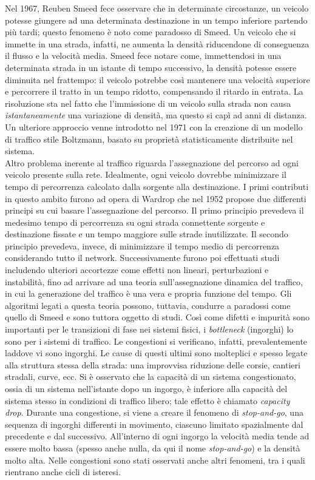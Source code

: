 \documentclass[../main.tex]{subfiles}
\begin{document}
Nel 1967, Reuben Smeed fece osservare che in determinate circostanze, un veicolo potesse giungere ad una determinata destinazione in un tempo inferiore partendo pi\`u tardi; questo fenomeno \`e noto come paradosso di Smeed.
Un veicolo che si immette in una strada, infatti, ne aumenta la densit\`a riducendone di conseguenza il flusso e la velocit\`a media.
Smeed fece notare come, immettendosi in una determinata strada in un istante di tempo successivo, la densit\`a potesse essere diminuita nel frattempo: il veicolo potrebbe cos\`i mantenere una velocit\`a superiore e percorrere il tratto in un tempo ridotto, compensando il ritardo in entrata.
La risoluzione sta nel fatto che l'immissione di un veicolo sulla strada non causa \emph{istantaneamente} una variazione di densit\`a, ma questo si cap\`i ad anni di distanza.
Un ulteriore approccio venne introdotto nel 1971 con la creazione di un modello di traffico stile Boltzmann, basato su propriet\`a statisticamente distribuite nel sistema.\\
Altro problema inerente al traffico riguarda l'assegnazione del percorso ad ogni veicolo presente sulla rete.
Idealmente, ogni veicolo dovrebbe minimizzare il tempo di percorrenza calcolato dalla sorgente alla destinazione.
I primi contributi in questo ambito furono ad opera di Wardrop che nel 1952 propose due differenti principi su cui basare l'assegnazione del percorso.
Il primo principio prevedeva il medesimo tempo di percorrenza su ogni strada connettente sorgente e destinazione fissate e un tempo maggiore sulle strade inutilizzate.
Il secondo principio prevedeva, invece, di minimizzare il tempo medio di percorrenza considerando tutto il network.
Successivamente furono poi effettuati studi includendo ulteriori accortezze come effetti non lineari, perturbazioni e instabilit\`a, fino ad arrivare ad una teoria sull'assegnazione dinamica del traffico, in cui la generazione del traffico \`e una vera e propria funzione del tempo.
Gli algoritmi legati a questa teoria possono, tuttavia, condurre a paradossi come quello di Smeed e sono tuttora oggetto di studi.
Cos\`i come difetti e impurit\`a sono importanti per le transizioni di fase nei sistemi fisici, i \emph{bottleneck} (ingorghi) lo sono per i sistemi di traffico.
Le congestioni si verificano, infatti, prevalentemente laddove vi sono ingorghi.
Le cause di questi ultimi sono molteplici e spesso legate alla struttura stessa della strada: una improvvisa riduzione delle corsie, cantieri stradali, curve, ecc.
Si \`e osservato che la capacit\`a di un sistema congestionato, ossia di un sistema nell'istante dopo un ingorgo, \`e inferiore alla capacit\`a del sistema stesso in condizioni di traffico libero; tale effetto \`e chiamato \emph{capacity drop}.
Durante una congestione, si viene a creare il fenomeno di \emph{stop-and-go}, una sequenza di ingorghi differenti in movimento, ciascuno limitato spazialmente dal precedente e dal successivo.
All'interno di ogni ingorgo la velocit\`a media tende ad essere molto bassa (spesso anche nulla, da qui il nome \emph{stop-and-go}) e la densit\`a molto alta.
Nelle congestioni sono stati osservati anche altri fenomeni, tra i quali rientrano anche cicli di isteresi.
\end{document}
